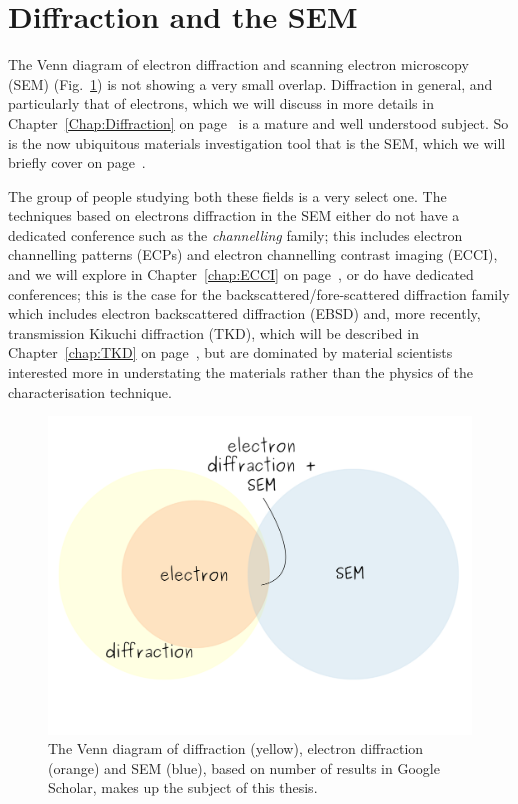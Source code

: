 \section{Diffraction and the SEM}


The Venn diagram of electron diffraction and scanning electron microscopy (SEM) (Fig.~\ref{Fig:Venn}) is not showing a very small overlap. Diffraction in general, and particularly that of electrons, which  we will discuss in more details in Chapter~\ref{Chap:Diffraction} on page~\pageref{Chap:Diffraction} is a mature and well understood subject. So is the now ubiquitous materials investigation tool that is the SEM, which we will briefly cover on page~\pageref{sec:sem}. 

The group of people studying both these fields is a very select one. The techniques based on electrons diffraction in the SEM either do not have a dedicated conference such as the \textit{channelling} family; this includes electron channelling patterns (ECPs) and electron channelling contrast imaging (ECCI), and we will explore in Chapter~\ref{chap:ECCI} on page~\pageref{chap:ECCI}, or do have dedicated conferences; this is the case for the backscattered/fore-scattered diffraction family which includes electron backscattered diffraction (EBSD) and, more recently, transmission Kikuchi diffraction (TKD), which will be described in Chapter~\ref{chap:TKD} on page~\pageref{chap:TKD}, but are dominated by material scientists interested more in understating the materials rather than the physics of the characterisation technique. 

\begin{figure}[ht]
\centering
\includegraphics[width=0.72\linewidth]{Figures/VenSEM.png}
\caption[SEM and electron diffraction Venn diagram.]{The Venn diagram of diffraction (yellow), electron diffraction (orange) and SEM (blue), based on number of results in Google Scholar, makes up the subject of this thesis.}
\label{Fig:Venn}
\end{figure}

